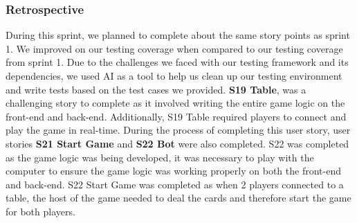 \subsubsection{Retrospective}
During this sprint, we planned to complete about the same story points as sprint 1. We improved on our testing coverage when compared to our testing coverage from sprint 1. Due to the challenges we faced with our testing framework and its dependencies, we used AI as a tool to help us clean up our testing environment and write tests based on the test cases we provided. \textbf{S19 Table}, was a challenging story to complete as it involved writing the entire game logic on the front-end and back-end. Additionally, S19 Table required players to connect and play the game in real-time. During the process of completing this user story, user stories \textbf{S21 Start Game} and \textbf{S22 Bot} were also completed. S22 was completed as the game logic was being developed, it was necessary to play with the computer to ensure the game logic was working properly on both the front-end and back-end. S22 Start Game was completed as when 2 players connected to a table, the host of the game needed to deal the cards and therefore start the game for both players. 

